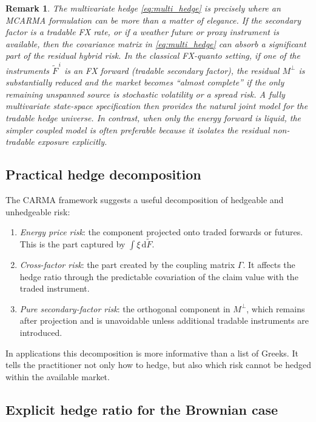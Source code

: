 \documentclass[10pt,a4paper,reqno]{amsart}
\newtheorem{remark}[theorem]{Remark}
\newcommand{\1}{\mathbbm{1}}
\newcommand{\dd}{\mathrm{d}}
\begin{document}
\begin{remark}
The multivariate hedge \eqref{eq:multi_hedge} is precisely where an MCARMA
formulation can be more than a matter of elegance. If the secondary factor is a
tradable FX rate, or if a weather future or proxy instrument is available, then
the covariance matrix in \eqref{eq:multi_hedge} can absorb a significant part of
the residual hybrid risk. In the classical FX-quanto setting, if one of the
instruments \(\widetilde{F}^{\,i}\) is an FX forward (tradable secondary factor),
the residual \(M^{\perp}\) is substantially reduced and the market becomes
``almost complete'' if the only remaining unspanned source is stochastic
volatility or a spread risk. A fully multivariate state-space specification then
provides the natural joint model for the tradable hedge universe. In contrast,
when only the energy forward is liquid, the simpler coupled model is often
preferable because it isolates the residual non-tradable exposure explicitly.
\end{remark}

\subsection{Practical hedge decomposition}

The CARMA framework suggests a useful decomposition of hedgeable and unhedgeable
risk:
\begin{enumerate}[label=(\roman*)]
  \item \emph{Energy price risk}: the component projected onto traded forwards or
    futures. This is the part captured by \(\int \xi\,\dd \widetilde{F}\).
  \item \emph{Cross-factor risk}: the part created by the coupling matrix
    \(\Gamma\). It affects the hedge ratio through the predictable covariation of
    the claim value with the traded instrument.
  \item \emph{Pure secondary-factor risk}: the orthogonal component in
    \(M^{\perp}\), which remains after projection and is unavoidable unless
    additional tradable instruments are introduced.
\end{enumerate}
In applications this decomposition is more informative than a list of Greeks.
It tells the practitioner not only how to hedge, but also which risk cannot be
hedged within the available market.

\subsection{Explicit hedge ratio for the Brownian case}
\end{document}
